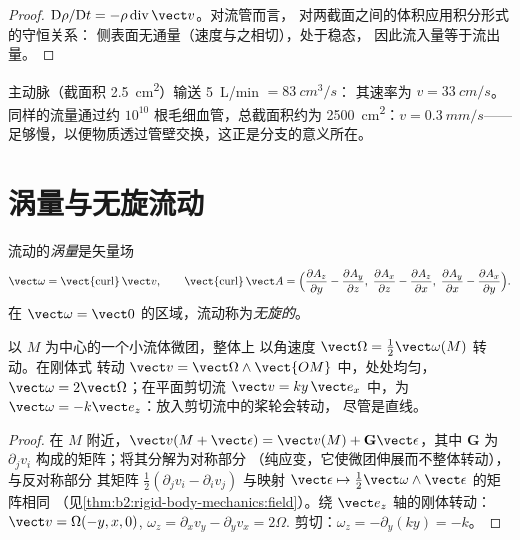 \begin{proof}
$\mathrm D\rho/\mathrm Dt = -\rho\operatorname{div}\vect v$。对流管而言，
对两截面之间的体积应用积分形式的守恒关系：
侧表面无通量（速度与之相切），处于稳态，
因此流入量等于流出量。
\end{proof}

\begin{example}[血液]\label{ex:b2:fluid-kinematics:blood}
主动脉（截面积 \qty{2.5}{cm^2}）输送 \qty{5}{L/min} $= \qty{83}{cm^3/s}$：
其速率为 $v = \qty{33}{cm/s}$。同样的流量通过约 $10^{10}$
根毛细血管，总截面积约为 \qty{2500}{cm^2}：$v = \qty{0.3}{mm/s}$——
足够慢，以便物质透过管壁交换，这正是分支的意义所在。
\end{example}

\section{涡量与无旋流动}

\begin{definition}[涡量]\label{def:b2:fluid-kinematics:vorticity}
流动的\emph{涡量}是矢量场
\[
\vect\omega = \operatorname{\vect{curl}}\vect v , \qquad
\operatorname{\vect{curl}}\vect A = \Bigl(\frac{\partial A_z}{\partial y} -
\frac{\partial A_y}{\partial z},\; \frac{\partial A_x}{\partial z} - \frac{\partial A_z}
{\partial x},\; \frac{\partial A_y}{\partial x} - \frac{\partial A_x}{\partial y}\Bigr) .
\]
在 $\vect\omega = \vect 0$ 的区域，流动称为\emph{无旋的}。
\end{definition}

\begin{proposition}[涡量度量局部转动]\label{prop:b2:fluid-kinematics:rotation}
以 $M$ 为中心的一个小流体微团，整体上
以角速度 $\vect\Omega = \tfrac12\vect\omega(M)$ 转动。在刚体式
转动 $\vect v = \vect\Omega\wedge\vect{OM}$ 中，处处均匀，
$\vect\omega = 2\vect\Omega$；在平面剪切流 $\vect v = ky\,\vect e_x$
中，为 $\vect\omega = -k\vect e_z$：放入剪切流中的桨轮会转动，
尽管是直线。
\end{proposition}

\begin{proof}
在 $M$ 附近，$\vect v(M + \vect\epsilon) = \vect v(M) + \mathbf G\vect\epsilon$，其中
$\mathbf G$ 为 $\partial_jv_i$ 构成的矩阵；将其分解为对称部分
（纯应变，它使微团伸展而不整体转动），与反对称部分
其矩阵 $\tfrac12(\partial_jv_i -
\partial_iv_j)$ 与映射 $\vect\epsilon \mapsto \tfrac12\vect\omega\wedge\vect\epsilon$ 的矩阵相同
（见\cref{thm:b2:rigid-body-mechanics:field}）。绕 $\vect e_z$ 轴的刚体转动：
$\vect v = \Omega(-y, x, 0)$, $\omega_z = \partial_xv_y - \partial_yv_x = 2\Omega$.
剪切：$\omega_z = -\partial_y(ky) = -k$。
\end{proof}

